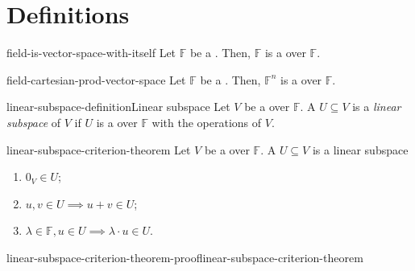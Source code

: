 \documentclass[preview]{standalone}
\begin{document}
\genpage

\section{Definitions}


\begin{snippetproposition}{field-is-vector-space-with-itself}{}
    Let \(\mathbb{F}\) be a \field. Then, \(\mathbb{F}\) is a
    \vectorspace over \(\mathbb{F}\).
\end{snippetproposition}

\begin{snippetproposition}{field-cartesian-prod-vector-space}{}
    Let \(\mathbb{F}\) be a \field. Then, \({\mathbb{F}}^n\) is a
    \vectorspace over \(\mathbb{F}\).
\end{snippetproposition}

\begin{snippetdefinition}{linear-subspace-definition}{Linear subspace}
    Let \(V\) be a \vectorspace over \(\mathbb{F}\). A \set \(U \subseteq V\)
    is a \emph{linear subspace} of \(V\) if \(U\) is a \vectorspace over \(\mathbb{F}\)
    with the operations of \(V\).
\end{snippetdefinition}

\begin{snippettheorem}{linear-subspace-criterion-theorem}{}
    Let \(V\) be a \vectorspace over \(\mathbb{F}\).
    A \set \(U \subseteq V\) is a linear subspace \ifandonlyif
    \begin{enumerate}
        \item \(0_V \in U\);
        \item \(u,v \in U \implies u+v \in U\);
        \item \(\lambda \in \mathbb{F}, u\in U \implies \lambda \cdot u \in U\).
    \end{enumerate}
\end{snippettheorem}

\begin{snippetproof}{linear-subspace-criterion-theorem-proof}{linear-subspace-criterion-theorem}{}
\end{snippetproof}
\end{document}

